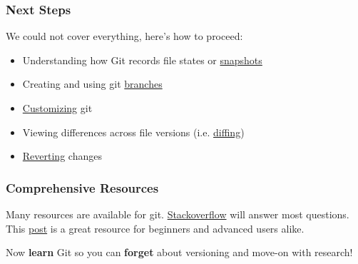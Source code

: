 \begin{frame}[t]\frametitle{Next Steps}
	We could not cover everything, here's how to proceed:

	\begin{itemize}
		\item Understanding how Git records file states or
		\href{http://git-scm.com/book/en/Getting-Started-Git-Basics}{snapshots}
		\item Creating and using git 
		\href{http://git-scm.com/book/en/Git-Branching-What-a-Branch-Is}{branches}
		\item \href{http://git-scm.com/book/en/Getting-Started-First-Time-Git-Setup}{Customizing} git
		\item Viewing differences across file versions 
		(i.e. \href{http://git-scm.com/book/en/Git-Basics-Recording-Changes-to-the-Repository}{diffing})
		\item \href{http://git-scm.com/book/en/Git-Basics-Undoing-Things}{Reverting} changes
	\end{itemize}
\end{frame}

\begin{frame}\frametitle{Comprehensive Resources}
    Many resources are available for git. 
    \href{http://stackoverflow.com/questions/tagged/git}{Stackoverflow} 
    will answer most questions. This 
    \href{http://stackoverflow.com/questions/315911/git-for-beginners-the-definitive-practical-guide}{post} is a great resource for beginners and advanced users alike.
\end{frame}

\begin{frame}
	Now \textbf{learn} Git so you can \textbf{forget} about
	versioning and move-on with research!
\end{frame}